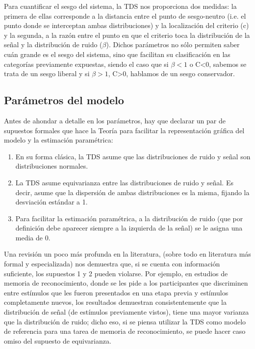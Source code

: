 \begin{itemize}
\begin{itemize}
Para cuantificar el sesgo del sistema, la TDS nos proporciona dos medidas: la primera de ellas corresponde a la distancia entre el punto de sesgo-neutro (i.e. el punto donde se interceptan ambas distribuciones) y la localización del criterio (c) y la segunda, a la razón entre el punto en que el criterio toca la distribución de la señal y la distribución de ruido ($\beta$). Dichos parámetros no sólo permiten saber cuán grande es el sesgo del sistema, sino que facilitan su clasificación en las categorías previamente expuestas, siendo el caso que si $\beta<1$ o C<0, sabemos se trata de un sesgo liberal y si $\beta>1$, C>0, hablamos de un sesgo conservador.\\
     \end{itemize}
\end{itemize}




\subsection{Parámetros del modelo}

Antes de ahondar a detalle en los parámetros, hay que declarar un par de supuestos formales que hace la Teoría para facilitar la representación gráfica del modelo y la estimación paramétrica:

\begin{enumerate}
\item En su forma clásica, la TDS asume que las distribuciones de ruido y señal son distribuciones normales.
\item La TDS asume equivarianza entre las distribuciones de ruido y señal. Es decir, asume que la dispersión de ambas distribuciones es la misma, fijando la desviación estándar a 1.
\item Para facilitar la estimación paramétrica, a la distribución de ruido (que por definición debe aparecer siempre a la izquierda de la señal) se le asigna una media de 0.
\end{enumerate}

Una revisión un poco más profunda en la literatura, (sobre todo en literatura más formal y especializada) nos demuestra que, si se cuenta con información suficiente, los supuestos 1 y 2 pueden violarse. Por ejemplo, en estudios de memoria de reconocimiento, donde se les pide a los participantes que discriminen entre estímulos que les fueron presentados en una etapa previa y estímulos completamente nuevos,  los resultados demuestran consistentemente que la distribución de señal (de estímulos previamente vistos), tiene una mayor varianza que la distribución de ruido; dicho eso, si se piensa utilizar la TDS como modelo de referencia para una tarea de memoria de reconocimiento, se puede hacer caso omiso del supuesto de equivarianza.  

